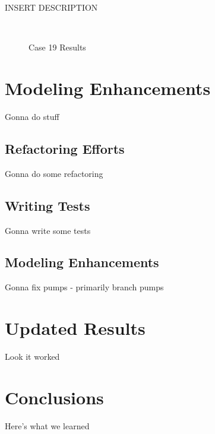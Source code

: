 \documentclass{report}
\begin{document}
    INSERT DESCRIPTION

    \begin{figure*}[hbt]
        \centering
        ~
        \caption{Case 19 Results}
    \end{figure*}

    \chapter{Modeling Enhancements}\label{ch:enhancements}

    Gonna do stuff

    \section{Refactoring Efforts}\label{sec:enhancements-refactor}

    Gonna do some refactoring

    \section{Writing Tests}\label{sec:enhancements-tests}

    Gonna write some tests

    \section{Modeling Enhancements}\label{sec:enhancements-fixes}

    Gonna fix pumps - primarily branch pumps

    \chapter{Updated Results}\label{ch:newresults}

    Look it worked

    \chapter{Conclusions}\label{ch:conclusions}

    Here's what we learned
\end{document}
